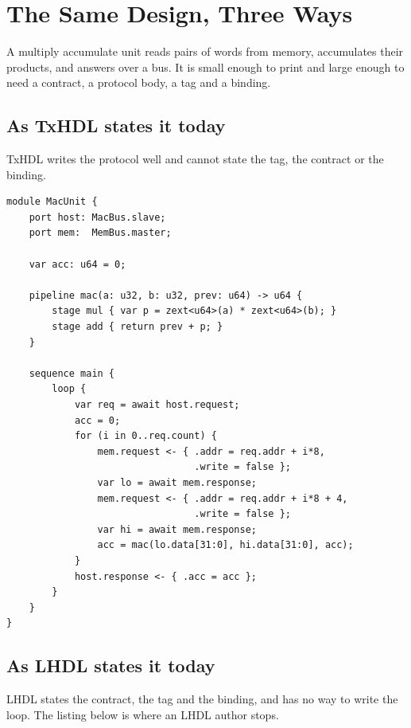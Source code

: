 \section{The Same Design, Three Ways}
\label{sec:worked-example}

A multiply accumulate unit reads pairs of words from memory, accumulates
their products, and answers over a bus. It is small enough to print and
large enough to need a contract, a protocol body, a tag and a binding.

\subsection{As TxHDL states it today}

TxHDL writes the protocol well and cannot state the tag, the contract or the
binding.

\begin{lstlisting}[caption={The multiply accumulate unit as TxHDL states it today. The protocol reads well; the tag, the contract and the binding cannot be written at all.},label={lst:mac-txhdl}]
module MacUnit {
    port host: MacBus.slave;
    port mem:  MemBus.master;

    var acc: u64 = 0;

    pipeline mac(a: u32, b: u32, prev: u64) -> u64 {
        stage mul { var p = zext<u64>(a) * zext<u64>(b); }
        stage add { return prev + p; }
    }

    sequence main {
        loop {
            var req = await host.request;
            acc = 0;
            for (i in 0..req.count) {
                mem.request <- { .addr = req.addr + i*8,
                                 .write = false };
                var lo = await mem.response;
                mem.request <- { .addr = req.addr + i*8 + 4,
                                 .write = false };
                var hi = await mem.response;
                acc = mac(lo.data[31:0], hi.data[31:0], acc);
            }
            host.response <- { .acc = acc };
        }
    }
}
\end{lstlisting}

\subsection{As LHDL states it today}

LHDL states the contract, the tag and the binding, and has no way to write
the loop. The listing below is where an LHDL author stops.


